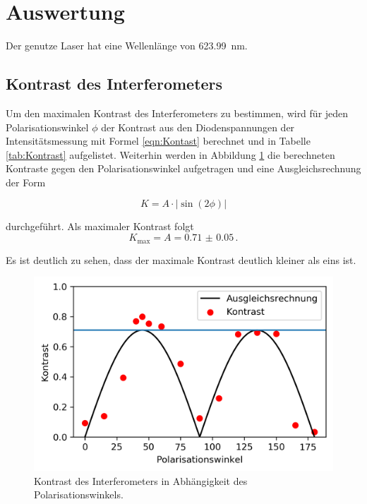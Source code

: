 \section{Auswertung}
Der genutze Laser hat eine Wellenlänge von \SI{623.99}{\nano\meter}.

\subsection{Kontrast des Interferometers}
Um den maximalen Kontrast des Interferometers zu bestimmen, wird für jeden Polarisationswinkel $\phi$  der Kontrast aus den Diodenspannungen der Intensitätsmessung mit Formel \ref{eqn:Kontast} berechnet und in Tabelle \ref{tab:Kontrast} aufgelistet.
Weiterhin werden in Abbildung \ref{fig:Kontrast} die berechneten Kontraste gegen den Polarisationswinkel aufgetragen und eine Ausgleichsrechnung der Form

\begin{equation*}
  K = A \cdot |\sin(2 \phi)|
\end{equation*}

durchgeführt. Als maximaler Kontrast folgt
\begin{equation}
  K_\text{max} = A = \num{0.71(5)} \, .
  \label{eqn:Kontrast}
\end{equation}

Es ist deutlich zu sehen, dass der maximale Kontrast deutlich kleiner als eins ist.

\begin{figure}[H]
  \centering
  \includegraphics[width = .5\textwidth]{Auswertung/Plots/Kontrast.png}
  \caption{Kontrast des Interferometers in Abhängigkeit des Polarisationswinkels. }
  \label{fig:Kontrast}
\end{figure}

